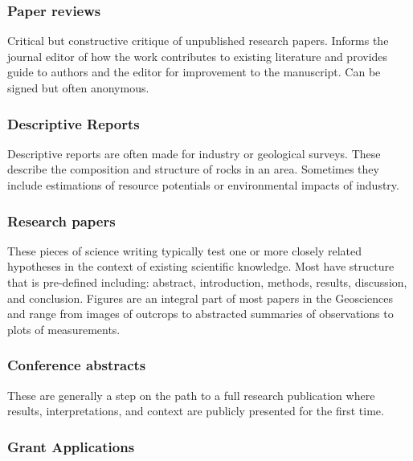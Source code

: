 \documentclass[11pt,]{article}
\begin{document}
\hypertarget{paper-reviews}{%
\subsubsection{Paper reviews}\label{paper-reviews}}

Critical but constructive critique of unpublished research papers.
Informs the journal editor of how the work contributes to existing
literature and provides guide to authors and the editor for improvement
to the manuscript. Can be signed but often anonymous.

\hypertarget{descriptive-reports}{%
\subsubsection{Descriptive Reports}\label{descriptive-reports}}

Descriptive reports are often made for industry or geological surveys.
These describe the composition and structure of rocks in an area.
Sometimes they include estimations of resource potentials or
environmental impacts of industry.

\hypertarget{research-papers}{%
\subsubsection{Research papers}\label{research-papers}}

These pieces of science writing typically test one or more closely
related hypotheses in the context of existing scientific knowledge. Most
have structure that is pre-defined including: abstract, introduction,
methods, results, discussion, and conclusion. Figures are an integral
part of most papers in the Geosciences and range from images of outcrops
to abstracted summaries of observations to plots of measurements.

\hypertarget{conference-abstracts}{%
\subsubsection{Conference abstracts}\label{conference-abstracts}}

These are generally a step on the path to a full research publication
where results, interpretations, and context are publicly presented for
the first time.

\hypertarget{grant-applications}{%
\subsubsection{Grant Applications}\label{grant-applications}}
\end{document}
